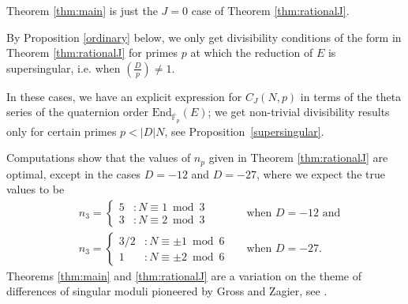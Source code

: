 \documentclass[11pt]{amsart}
\theoremstyle{definition}
\newcommand{\End} {{\mathrm{End}}}
\def\BF{\mathbb{F}}
\begin{document}
Theorem \ref{thm:main} is just the $J=0$ case of Theorem \ref{thm:rationalJ}.

By Proposition \ref{ordinary} below, we only get divisibility conditions of the form in Theorem \ref{thm:rationalJ} for primes $p$ at which the reduction of $E$ is supersingular, i.e. when $\displaystyle\left(\frac{D}{p}\right)\neq 1$.

In these cases, we have an explicit expression for $C_J(N,p)$ in terms of the theta series of the quaternion order $\End_{\bar{\BF}_p}(E)$; we get non-trivial divisibility results only for certain primes $p < |D|N$, see Proposition~\ref{supersingular}.

Computations show that the values of $n_p$ given in Theorem \ref{thm:rationalJ} are optimal, except in the cases $D=-12$ and $D=-27$, where we expect the true values to be
\begin{align*}
    & n_3 = \left\{\begin{array}{ll}
            5 & : N \equiv 1 \bmod 3 \\
            3 & : N \equiv 2 \bmod 3 
        \end{array}\right. 
        & &  \text{when $D=-12$ and} \\
    & n_3 = \left\{\begin{array}{ll}
            3/2 & : N \equiv \pm1 \bmod 6 \\
            1 & : N \equiv \pm2 \bmod 6 
        \end{array}\right. 
        & & \text{when $D=-27$.}
\end{align*}
Theorems \ref{thm:main} and \ref{thm:rationalJ} are a variation on the theme of differences of singular moduli pioneered by Gross and Zagier, see \cite{Campagna2023, Dorman1988, GZ1985, LV2015}.
\end{document}
